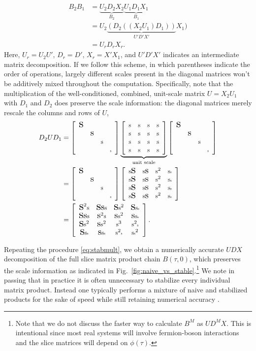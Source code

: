 \documentclass[submission, Phys]{SciPost}
\newcommand{\stiny}{\scalebox{0.5}{s}}
\newcommand{\ssmall}{\scalebox{0.9}{s}}
\newcommand{\smedium}{\scalebox{1.3}{s}}
\newcommand{\slarge}{\scalebox{1.7}{s}}
\newcommand{\U}{\left[
	\begin{array}{cccc}
		\ssmall & \ssmall & \ssmall & \ssmall \\
		\ssmall & \ssmall & \ssmall & \ssmall \\
		\ssmall & \ssmall & \ssmall & \ssmall \\
		\ssmall & \ssmall & \ssmall & \ssmall \\
	\end{array}
	\right]}
\newcommand{\D}{\left[
	\begin{array}{cccc}
		\slarge &  &  &  \\
		& \smedium &  &  \\
		&  & \ssmall &  \\
		&  &  & \stiny \\
	\end{array}
	\right]}
\begin{document}
\begin{align}
	B_2 B_1 &= \underbrace{U_2 D_2 X_2}_{B_2}\underbrace{U_1 D_1 X_1}_{B_1} \nonumber\\
	&= U_2 \underbrace{(D_2 ((X_2 U_1) D_1))}_{U' D' X'} X_1)\label{eq:stabmult}\\
	&= U_r D_r X_r. \nonumber
\end{align}
Here, $U_r = U_2 U'$, $D_r = D'$, $X_r = X' X_1$, and $U'D'X'$ indicates an intermediate matrix decomposition. If we follow this scheme, in which parentheses indicate the order of operations, largely different scales present in the diagonal matrices won't be additively mixed throughout the computation. Specifically, note that the multiplication of the well-conditioned, combined, unit-scale matrix $U = X_2 U_1$ with $D_1$ and $D_2$ does preserve the scale information: the diagonal matrices merely rescale the columns and rows of $U$,
\begin{align}
D_2  U D_1 &= \D  \underbrace{\U}_{\textrm{unit scale}} \D  \\
&= \D \left[
\begin{array}{cccc}
\ssmall\slarge & \ssmall\smedium & \ssmall^2 & \ssmall\stiny \\
\ssmall\slarge & \ssmall\smedium & \ssmall^2 & \ssmall\stiny \\
\ssmall\slarge & \ssmall\smedium & \ssmall^2 & \ssmall\stiny \\
\ssmall\slarge & \ssmall\smedium & \ssmall^2 & \ssmall\stiny \\
\end{array}
\right]\\
&= \left[
\begin{array}{cccc}
	\slarge^2\ssmall & \slarge\smedium\ssmall & \slarge\ssmall^2 & \slarge\ssmall\stiny \\
	\slarge\smedium\ssmall & \smedium^2\ssmall & \smedium\ssmall^2 & \smedium\ssmall\stiny \\
	\slarge\ssmall^2 & \smedium\ssmall^2 & \ssmall^3 & \ssmall^2\stiny \\
	\slarge\ssmall\stiny & \smedium\ssmall\stiny & \ssmall^2\stiny & \ssmall\stiny^2 \\
\end{array}
\right].
\end{align}

Repeating the procedure \eqref{eq:stabmult}, we obtain a numerically accurate $UDX$ decomposition of the full slice matrix product chain $B(\tau, 0)$, which preserves the scale information as indicated in Fig.~\ref{fig:naive_vs_stable}.\footnote{Note that we do not discuss the faster way to calculate $B^M$ as $U D^M X$. This is intentional since most real systems will involve fermion-boson interactions and the slice matrices will depend on $\phi(\tau)$.} We note in passing that in practice it is often unnecessary to stabilize every individual matrix product. Instead one typically performs a mixture of naive and stabilized products for the sake of speed while still retaining numerical accuracy \cite{Assaad2002a}.
\end{document}
